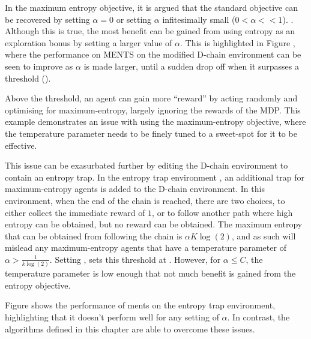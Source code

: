     In the maximum entropy objective, it is argued that the standard objective can be recovered by setting $\alpha=0$ or setting $\alpha$ infitesimally small ($0<\alpha<<1$). . 
    Although this is true, the most benefit can be gained from using entropy as an exploration bonus by setting a larger value of $\alpha$. This is highlighted in Figure , where the performance on MENTS on the modified D-chain environment can be seen to improve as $\alpha$ is made larger, until a sudden drop off when it surpasses a threshold ().
     
    Above the threshold, an agent can gain more ``reward'' by acting randomly and optimising for maximum-entropy, largely ignoring the rewards of the MDP. This example demonstrates an issue with using the maximum-entropy objective, where the temperature parameter needs to be finely tuned to a sweet-spot for it to be effective.

    This issue can be exasurbated further by editing the D-chain environment to contain an entropy trap. In the entropy trap environment , an additional trap for maximum-entropy agents is added to the D-chain environment. In this environment, when the end of the chain is reached, there are two choices, to either collect the immediate reward of $1$, or to follow another path where high entropy can be obtained, but no reward can be obtained. The maximum entropy that can be obtained from following the chain is $\alpha K \log(2)$, and as such will mislead any maximum-entropy agents that have a temperature parameter of $\alpha > \frac{1}{k\log(2)}$. Setting , sets this threshold at . However, for $\alpha \leq C$, the temperature parameter is low enough that not much benefit is gained from the entropy objective.

    Figure  shows the performance of ments on the entropy trap environment, highlighting that it doesn't perform well for any setting of $\alpha$. In contrast, the algorithms defined in this chapter are able to overcome these issues.
    
